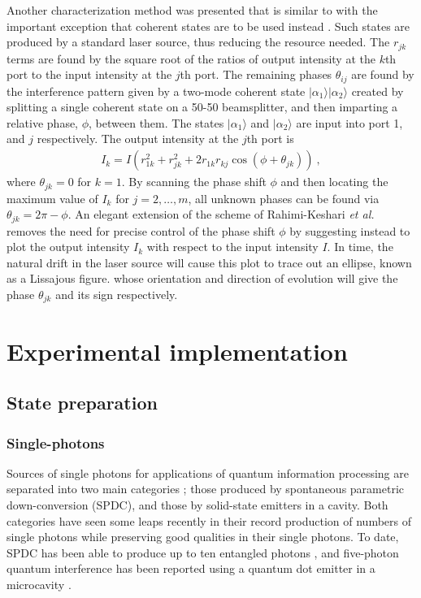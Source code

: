 \documentclass[aps,rmp,twocolumn,amsmath,amssymb,nofootinbib,superscriptaddress]{revtex4}
\newcommand{\ket}[1]{|#1\rangle}
\begin{document}
Another characterization method was presented that is similar to \cite{bib:Laing12} with the important exception that coherent states are to be used instead \cite{bib:Rahimi-Keshari13,bib:Heilmann15}. Such states are produced by a standard laser source, thus reducing the resource needed. The $r_{jk}$ terms are found by the square root of the ratios of output intensity at the $k$th port to the input intensity at the $j$th port. The remaining phases $\theta_{ij}$ are found by the interference pattern given by a two-mode coherent state $\ket{\alpha_1}\ket{\alpha_2}$ created by splitting a single coherent state on a 50-50 beamsplitter, and then imparting a relative phase, $\phi$, between them. The states $\ket{\alpha_1}$ and $\ket{\alpha_2}$ are input into port 1, and $j$ respectively. The output intensity at the $j$th port is 
\begin{align}
I_k=I(r_{1k}^2+r_{jk}^2+2 r_{1k}r_{kj}\cos(\phi+\theta_{jk})) \ ,
\end{align}
where $\theta_{jk}=0$ for $k=1$. By scanning the phase shift $\phi$ and then locating the maximum value of $I_k$ for $j=2,\ldots, m$, all unknown phases can be found via $\theta_{jk}=2\pi-\phi$. An elegant extension of the scheme of Rahimi-Keshari {\it et al.} removes the need for precise control of the phase shift $\phi$ \cite{bib:Heilmann15} by suggesting instead to plot the output intensity $I_k$ with respect to the input intensity $I$. In time, the natural drift in the laser source will cause this plot to trace out an ellipse, known as a Lissajous figure. whose orientation and direction of evolution will give the phase $\theta_{jk}$ and its sign respectively.

\section{Experimental implementation}

\subsection{State preparation}

\subsubsection{Single-photons}

Sources of single photons for applications of quantum information processing are 
separated into two main categories \cite{bib:Kok05}; those produced by spontaneous 
parametric down-conversion (SPDC), and those by solid-state emitters in a cavity. 
Both categories have seen some leaps recently in their record production of numbers 
of single photons while preserving good qualities in their single photons. To 
date, SPDC has been able to produce up to ten entangled photons 
\cite{bib:WangChen16,bib:Chen17}, and five-photon quantum interference has been 
reported using a quantum dot emitter in a microcavity \cite{bib:WangHe16}.
\end{document}
